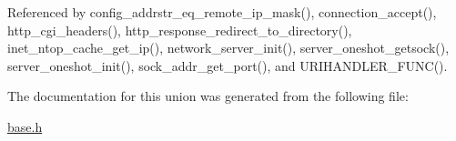 Referenced by config\-\_\-addrstr\-\_\-eq\-\_\-remote\-\_\-ip\-\_\-mask(), connection\-\_\-accept(), http\-\_\-cgi\-\_\-headers(), http\-\_\-response\-\_\-redirect\-\_\-to\-\_\-directory(), inet\-\_\-ntop\-\_\-cache\-\_\-get\-\_\-ip(), network\-\_\-server\-\_\-init(), server\-\_\-oneshot\-\_\-getsock(), server\-\_\-oneshot\-\_\-init(), sock\-\_\-addr\-\_\-get\-\_\-port(), and U\-R\-I\-H\-A\-N\-D\-L\-E\-R\-\_\-\-F\-U\-N\-C().



The documentation for this union was generated from the following file\-:\begin{DoxyCompactItemize}
\item 
\hyperlink{base_8h}{base.\-h}\end{DoxyCompactItemize}

